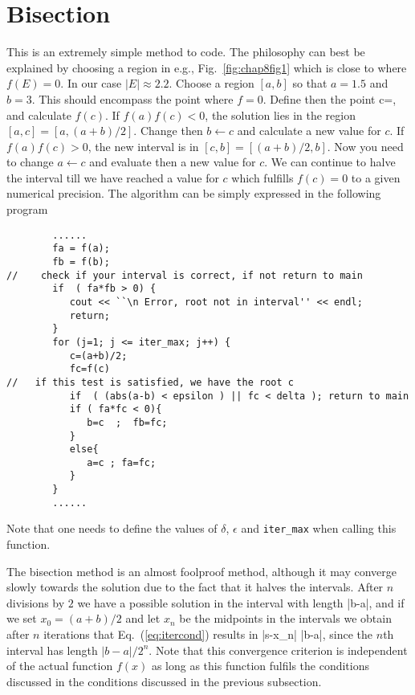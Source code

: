 \section{Bisection} \label{sec:bisec}

This is an extremely simple method to code. The philosophy can best be  explained
by choosing a region in e.g., Fig.\ \ref{fig:chap8fig1} which is close to where $f(E)=0$.
In our case $|E|\approx 2.2$. Choose a region $[a,b]$ so that $a=1.5$ and $b=3$.
This should encompass the point where $f=0$. 
Define then the point 
\be
 c=,
\ee
and calculate $f(c)$. If $f(a)f(c) < 0$, the solution lies in the region $[a,c]=[a,(a+b)/2]$. 
Change then $b\leftarrow c$ and calculate a new value for $c$. 
If $f(a)f(c) >  0$, the new interval is in $[c,b]=[(a+b)/2,b]$. Now you need to change 
$a\leftarrow c$ and evaluate then a new value for $c$. We can continue to halve
the interval till we have reached a value for $c$ which fulfills $f(c)=0$
to a given numerical precision. The algorithm can be simply expressed in the following program
\lstset{language=c++}
\begin{lstlisting}
        ......
        fa = f(a);
        fb = f(b);
//    check if your interval is correct, if not return to main 
        if  ( fa*fb > 0) { 
           cout << ``\n Error, root not in interval'' << endl; 
           return; 
        }
        for (j=1; j <= iter_max; j++) {
           c=(a+b)/2;
           fc=f(c)
//   if this test is satisfied, we have the root c
           if  ( (abs(a-b) < epsilon ) || fc < delta ); return to main 
           if ( fa*fc < 0){
              b=c  ;  fb=fc;
           }
           else{
              a=c ; fa=fc;
           }
        }
        ......
\end{lstlisting}
Note that one needs to define the values of $\delta$, $\epsilon$ and
\verb$iter_max$ when calling
this function.

The bisection method is an almost foolproof method, although it may converge
slowly towards the solution due to the fact that it halves the intervals.
After $n$ divisions by $2$ we have a possible solution in the interval
with length 
\be
   \left|b-a\right|,
\ee
and if we set $x_0=(a+b)/2$ and let $x_n$ be the midpoints in the intervals
we obtain after $n$ iterations that Eq.\ (\ref{eq:itercond}) results in
\be
    \left|s-x_n\right| \le {}\left|b-a\right|,
     \label{eq:bisectest}
\ee     
since the $n$th interval has length $|b-a|/2^n$.
Note that this convergence criterion is independent of the 
actual function $f(x)$ as long as this function fulfils the conditions
discussed in the conditions discussed in the previous subsection. 

